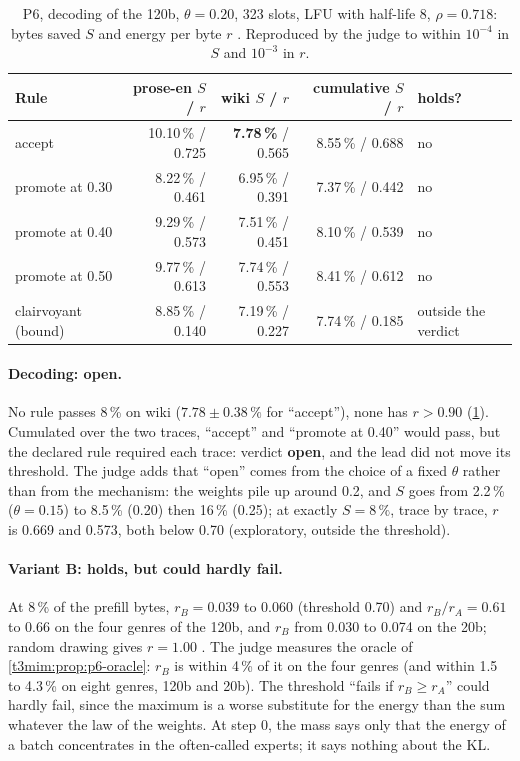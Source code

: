 \begin{table}[tbp]
\centering\small
\caption[P6: the decoding of the 120b]{P6, decoding of the 120b, $\theta = 0.20$, 323 slots, LFU with half-life 8, $\rho = 0.718$: bytes saved $S$ and energy per byte $r$ \mes. Reproduced by the judge to within $10^{-4}$ in $S$ and $10^{-3}$ in $r$.}
\label{t3mim:tab:p6}
\begin{tabular}{@{}lrrrl@{}}
\toprule
Rule & prose-en $S$ / $r$ & wiki $S$ / $r$ & cumulative $S$ / $r$ & holds? \\
\midrule
accept & 10.10\,\% / 0.725 & \textbf{7.78\,\%} / 0.565 & 8.55\,\% / 0.688 & no \\
promote at 0.30 & 8.22\,\% / 0.461 & 6.95\,\% / 0.391 & 7.37\,\% / 0.442 & no \\
promote at 0.40 & 9.29\,\% / 0.573 & 7.51\,\% / 0.451 & 8.10\,\% / 0.539 & no \\
promote at 0.50 & 9.77\,\% / 0.613 & 7.74\,\% / 0.553 & 8.41\,\% / 0.612 & no \\
clairvoyant (bound) & 8.85\,\% / 0.140 & 7.19\,\% / 0.227 & 7.74\,\% / 0.185 & outside the verdict \\
\bottomrule
\end{tabular}
\end{table}

\paragraph{Decoding: open.} No rule passes 8\,\% on wiki ($7.78 \pm 0.38\,\%$ for ``accept''), none has $r > 0.90$ (\cref{t3mim:tab:p6}). Cumulated over the two traces, ``accept'' and ``promote at 0.40'' would pass, but the declared rule required each trace: verdict \textbf{open}, and the lead did not move its threshold. The judge adds that ``open'' comes from the choice of a fixed $\theta$ rather than from the mechanism: the weights pile up around 0.2, and $S$ goes from 2.2\,\% ($\theta = 0.15$) to 8.5\,\% (0.20) then 16\,\% (0.25); at exactly $S = 8\,\%$, trace by trace, $r$ is 0.669 and 0.573, both below 0.70 (exploratory, outside the threshold).

\paragraph{Variant B: holds, but could hardly fail.} At 8\,\% of the prefill bytes, $r_B = 0.039$ to $0.060$ (threshold 0.70) and $r_B/r_A = 0.61$ to $0.66$ on the four genres of the 120b, and $r_B$ from 0.030 to 0.074 on the 20b; random drawing gives $r = 1.00$ \mes. The judge measures the oracle of \cref{t3mim:prop:p6-oracle}: $r_B$ is within 4\,\% of it on the four genres (and within 1.5 to 4.3\,\% on eight genres, 120b and 20b). The threshold ``fails if $r_B \ge r_A$'' could hardly fail, since the maximum is a worse substitute for the energy than the sum whatever the law of the weights. At step 0, the mass says only that the energy of a batch concentrates in the often-called experts; it says nothing about the KL.

